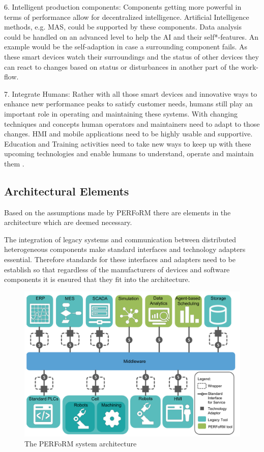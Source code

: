 \documentclass[conference,compsoc,hidelinks]{IEEEtran}
\begin{document}
6. Intelligent production components: Components getting more powerful in terms of performance allow for decentralized intelligence. Artificial Intelligence methods, e.g. MAS, could be supported by these components. Data analysis could be handled on an advanced level to help the AI and their self*-features. An example would be the self-adaption in case a surrounding component fails. As these smart devices watch their surroundings and the status of other devices they can react to changes based on status or disturbances in another part of the work-flow.

7. Integrate Humans: Rather with all those smart devices and innovative ways to enhance new performance peaks to satisfy customer needs, humans still play an important role in operating and maintaining these systems. With changing techniques and concepts human operators and maintainers need to adapt to those changes. HMI and mobile applications need to be highly usable and supportive. Education and Training activities need to take new ways to keep up with these upcoming technologies and enable humans to understand, operate and maintain them \cite{SpecPERFoRM}.

\subsection{Architectural Elements}
Based on the assumptions made by PERFoRM there are elements in the architecture which are deemed necessary.

The integration of legacy systems and communication between distributed heterogeneous components make standard interfaces and technology adapters essential.
Therefore standards for these interfaces and adapters need to be establish so that regardless of the manufacturers of devices and software components it is ensured that they fit into the architecture.

\begin{figure}[ht]
	\includegraphics[width=\columnwidth]{img/PERFoRM-Architecture.png}
	\caption{The PERFoRM system architecture\cite{SpecPERFoRM}}
\end{figure}
\end{document}

